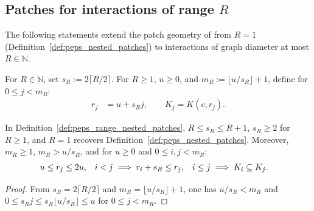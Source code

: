 \subsection{Patches for interactions of range \texorpdfstring{$R$}{R}}
\label{sec:peps_range_nested_patches}

The following statements extend the patch geometry of \cite{OpenAI2026PolynomialPEPS} from $R=1$ (Definition~\ref{def:peps_nested_patches}) to interactions of graph diameter at most $R\in\mathbb N$.

\begin{definition}
    \label{def:peps_range_nested_patches}
    \leanok
    For $R\in\mathbb N$, set $s_R:=2\lceil R/2\rceil$. For $R\ge1$, $u\ge0$, and $m_R:=\lfloor u/s_R\rfloor+1$, define for $0\le j<m_R$:
    \begin{align}
        r_j & =u+s_Rj,\qquad K_j=K(c,r_j).
        \label{eq:peps_range_nested_patches}
    \end{align}
\end{definition}

\begin{lemma}
    \label{thm:peps_range_nested_patch_sizes}
    \leanok
    In Definition~\ref{def:peps_range_nested_patches}, $R\le s_R\le R+1$, $s_R\ge2$ for $R\ge1$, and $R=1$ recovers Definition~\ref{def:peps_nested_patches}. Moreover, $m_R\ge1$, $m_R>u/s_R$, and for $u\ge0$ and $0\le i,j<m_R$:
    \begin{align}
        u\le r_j             & \le 2u,               &
        i<j \implies r_i+s_R & \le r_j,              &
        i\le j \implies K_i  & \subseteq K_j. \notag
    \end{align}
\end{lemma}
\begin{proof}\leanok
    From $s_R=2\lceil R/2\rceil$ and $m_R=\lfloor u/s_R\rfloor+1$, one has $u/s_R<m_R$ and $0\le s_Rj\le s_R\lfloor u/s_R\rfloor\le u$ for $0\le j<m_R$.
\end{proof}

